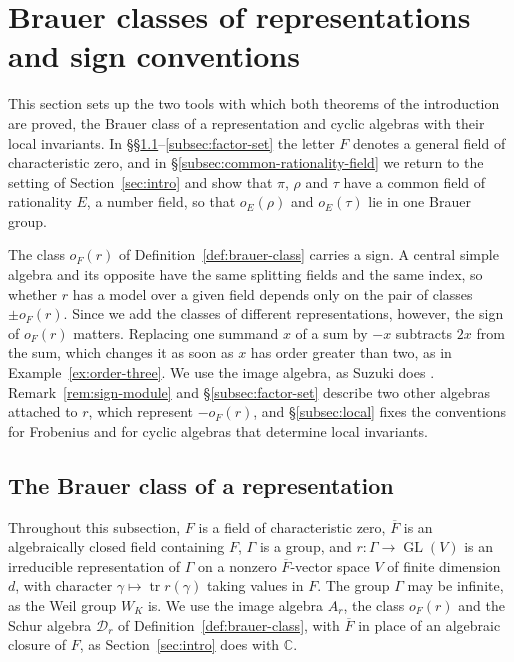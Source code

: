 \documentclass[a4paper,11pt]{amsart}
\theoremstyle{definition}
\theoremstyle{remark}
\numberwithin{equation}{section}
\DeclareMathOperator{\GL}{GL}
\DeclareMathOperator{\tr}{tr}
\newcommand{\C}{\mathbb{C}}
\begin{document}
\section{Brauer classes of representations and sign conventions}
\label{sec:brauer-classes}

This section sets up the two tools with which both theorems of the introduction are proved, the Brauer class of a representation and cyclic algebras with their local invariants. In \S\S\ref{subsec:brauer-class}--\ref{subsec:factor-set} the letter $F$ denotes a general field of characteristic zero, and in \S\ref{subsec:common-rationality-field} we return to the setting of Section~\ref{sec:intro} and show that $\pi$, $\rho$ and $\tau$ have a common field of rationality $E$, a number field, so that $o_E(\rho)$ and $o_E(\tau)$ lie in one Brauer group.

The class $o_F(r)$ of Definition~\ref{def:brauer-class} carries a sign. A central simple algebra and its opposite have the same splitting fields and the same index, so whether $r$ has a model over a given field depends only on the pair of classes $\pm o_F(r)$. Since we add the classes of different representations, however, the sign of $o_F(r)$ matters. Replacing one summand $x$ of a sum by $-x$ subtracts $2x$ from the sum, which changes it as soon as $x$ has order greater than two, as in Example~\ref{ex:order-three}. We use the image algebra, as Suzuki does \cite[Definition~3.0.6 and Lemma~3.0.7]{Su23}. Remark~\ref{rem:sign-module} and \S\ref{subsec:factor-set} describe two other algebras attached to $r$, which represent $-o_F(r)$, and \S\ref{subsec:local} fixes the conventions for Frobenius and for cyclic algebras that determine local invariants.

\subsection{The Brauer class of a representation}
\label{subsec:brauer-class}

Throughout this subsection, $F$ is a field of characteristic zero, $\overline F$ is an algebraically closed field containing $F$, $\Gamma$ is a group, and $r\colon\Gamma\to\GL(V)$ is an irreducible representation of $\Gamma$ on a nonzero $\overline F$-vector space $V$ of finite dimension $d$, with character $\gamma\mapsto\tr r(\gamma)$ taking values in $F$. The group $\Gamma$ may be infinite, as the Weil group $W_K$ is. We use the image algebra $A_r$, the class $o_F(r)$ and the Schur algebra $\mathcal D_r$ of Definition~\ref{def:brauer-class}, with $\overline F$ in place of an algebraic closure of $F$, as Section~\ref{sec:intro} does with $\C$.
\end{document}
